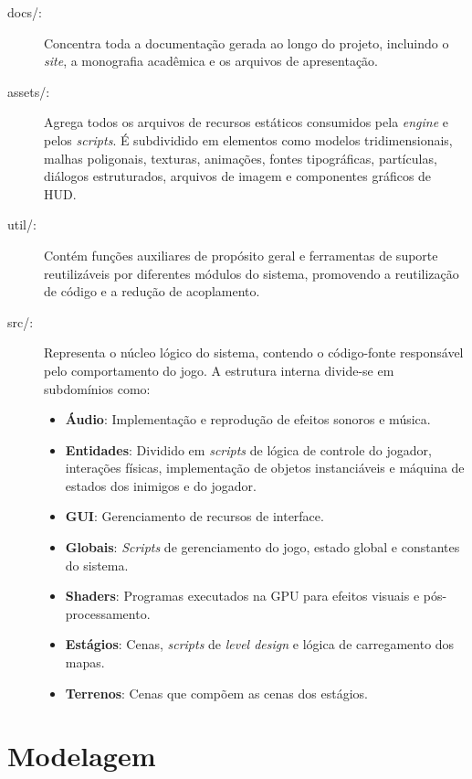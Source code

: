 \begin{description}
	\item[docs/:] Concentra toda a documentação gerada ao longo do projeto, incluindo o
	\textit{site}, a monografia acadêmica e os arquivos de apresentação.
	\item[assets/:] Agrega todos os arquivos de recursos estáticos consumidos pela
	\textit{engine} e pelos \textit{scripts}. É subdividido em elementos como modelos tridimensionais,
	malhas poligonais, texturas, animações, fontes tipográficas, partículas, diálogos
	estruturados, arquivos de imagem e componentes gráficos de HUD.
	\item[util/:] Contém funções auxiliares de propósito geral e ferramentas de suporte
	reutilizáveis por diferentes módulos do sistema, promovendo a reutilização de código
	e a redução de acoplamento.
	\item[src/:] Representa o núcleo lógico do sistema, contendo o código-fonte responsável
	pelo comportamento do jogo. A estrutura interna divide-se em subdomínios como:

	\begin{itemize}
		\item \textbf{Áudio}: Implementação e reprodução de efeitos sonoros e música.
		\item \textbf{Entidades}: Dividido em \textit{scripts} de lógica de controle do jogador,
		interações físicas, implementação de objetos instanciáveis e máquina de
		estados dos inimigos e do jogador.
		\item \textbf{GUI}: Gerenciamento de recursos de interface.
		\item \textbf{Globais}: \textit{Scripts} de gerenciamento do jogo, estado global e constantes do sistema.
		\item \textbf{Shaders}: Programas executados na GPU para efeitos visuais e pós-processamento.
		\item \textbf{Estágios}: Cenas, \textit{scripts} de \textit{level design} e lógica de carregamento dos mapas.
		\item \textbf{Terrenos}: Cenas que compõem as cenas dos estágios.
	\end{itemize}

\end{description}


\section{Modelagem}
\label{sec:modelagem}

